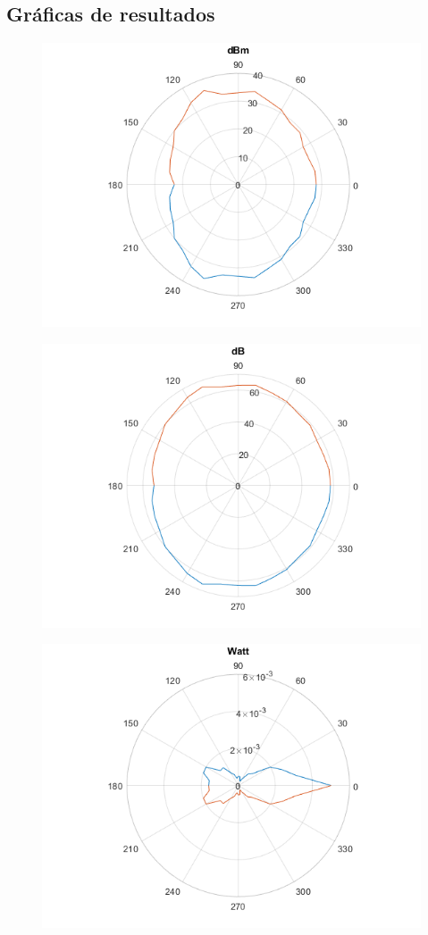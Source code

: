\documentclass[12pt,letterpaper]{article}
\begin{document}
\subsection{Gráficas de resultados}
\begin{figure}[h]
    \centering
    \includegraphics[width=.6\textwidth]{f7.png}
\end{figure}
\begin{figure}[h]
    \centering
    \includegraphics[width=.6\textwidth]{f8.png}
\end{figure}
\begin{figure}[h]
    \centering
    \includegraphics[width=.6\textwidth]{f9.png}
\end{figure}
\end{document}
